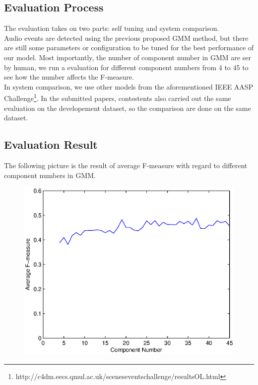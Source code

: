 \subsection{Evaluation Process}
The evaluation takes on two parts: self tuning and system comparison. \\ 

Audio events are detected using the previous proposed GMM method, but there are still some parameters or configuration to be tuned for the best performance of our model.
Most importantly, the number of component number in GMM are ser by human, we run a evaluation for different component numbers from 4 to 45 to see how the number affects the F-measure. \\ 

In system comparison, we use other models from the aforementioned IEEE AASP Challenge\footnote{http://c4dm.eecs.qmul.ac.uk/sceneseventschallenge/resultsOL.html}. 
In the submitted papers, contestents also carried out the same evaluation on the developement dataset, so the comparison are done on the same dataset.  

\subsection{Evaluation Result}
The following picture is the result of average F-measure with regard to different component numbers in GMM. 
\begin{figure}[htb]
\centering
\includegraphics[scale=0.85]{figure/evaluation/component}
\label{fig:component}
\end{figure}

